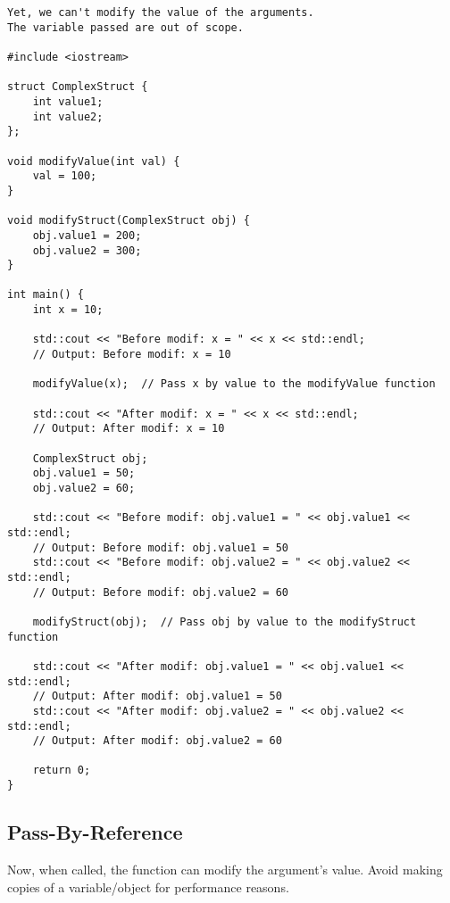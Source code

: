 \begin{verbatim}
Yet, we can't modify the value of the arguments.
The variable passed are out of scope.

#include <iostream>

struct ComplexStruct {
    int value1;
    int value2;
};

void modifyValue(int val) {
    val = 100;
}

void modifyStruct(ComplexStruct obj) {
    obj.value1 = 200;
    obj.value2 = 300;
}

int main() {
    int x = 10;

    std::cout << "Before modif: x = " << x << std::endl;  
    // Output: Before modif: x = 10

    modifyValue(x);  // Pass x by value to the modifyValue function

    std::cout << "After modif: x = " << x << std::endl;   
    // Output: After modif: x = 10

    ComplexStruct obj;
    obj.value1 = 50;
    obj.value2 = 60;

    std::cout << "Before modif: obj.value1 = " << obj.value1 << std::endl;  
    // Output: Before modif: obj.value1 = 50
    std::cout << "Before modif: obj.value2 = " << obj.value2 << std::endl;  
    // Output: Before modif: obj.value2 = 60

    modifyStruct(obj);  // Pass obj by value to the modifyStruct function

    std::cout << "After modif: obj.value1 = " << obj.value1 << std::endl;   
    // Output: After modif: obj.value1 = 50
    std::cout << "After modif: obj.value2 = " << obj.value2 << std::endl;   
    // Output: After modif: obj.value2 = 60

    return 0;
}
\end{verbatim}


\subsection{Pass-By-Reference}

Now, when called, the function can modify the argument's value.
Avoid making copies of a variable/object for performance reasons.

